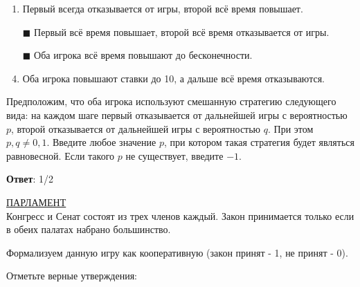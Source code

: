 \begin{enumerate}[label=$\square$]
	
	\item Первый всегда отказывается от игры, второй всё время повышает.
	\item[$\blacksquare$] Первый всё время повышает, второй всё время отказывается от игры.
	\item[$\blacksquare$] Оба игрока всё время повышают до бесконечности.
	\item Оба игрока повышают ставки до 10, а дальше всё время отказываются.
\end{enumerate}

\task
Предположим, что оба игрока используют смешанную стратегию следующего вида: на каждом шаге первый отказывается от дальнейшей игры с вероятностью $p$, второй отказывается от дальнейшей игры с вероятностью $q$. При этом $p,q \neq 0,1$. Введите любое значение $p$, при котором такая стратегия будет являться равновесной. Если такого $p$ не существует, введите $-1$.

\textbf{Ответ}:
1/2

\task
\underline{ПАРЛАМЕНТ} \\

Конгресс и Сенат состоят из трех членов каждый. Закон принимается только если в обеих палатах набрано большинство.

Формализуем данную игру как кооперативную (закон принят - 1, не принят - 0).

Отметьте верные утверждения:

